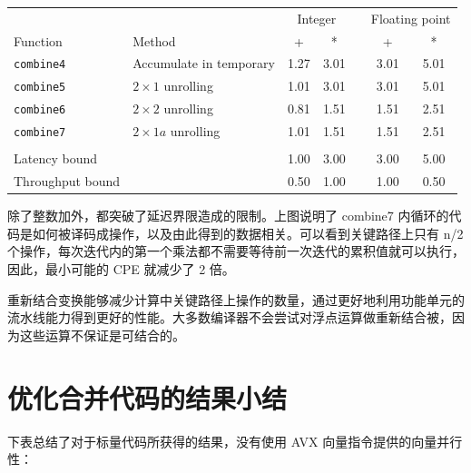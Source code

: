\begin{table}[!ht]
    \centering
    \begin{tabular}{llccccc}
        \toprule
        & & \multicolumn{2}{c}{Integer} & & \multicolumn{2}{c}{Floating point} \\
        \cmidrule{3-4} \cmidrule{6-7}
        Function & Method & + & * & & + & * \\
        \midrule
        \texttt{combine4} & Accumulate in temporary & 1.27 & 3.01 & & 3.01 & 5.01 \\
        \texttt{combine5} & $2 \times 1$ unrolling & 1.01 & 3.01 & & 3.01 & 5.01 \\
        \texttt{combine6} & $2 \times 2$ unrolling & 0.81 & 1.51 & & 1.51 & 2.51 \\
        \texttt{combine7} & $2 \times 1a$ unrolling & 1.01 & 1.51 & & 1.51 & 2.51 \\
        \\
        Latency bound & & 1.00 & 3.00 & & 3.00 & 5.00 \\
        Throughput bound & & 0.50 & 1.00 & & 1.00 & 0.50 \\
        \bottomrule
    \end{tabular}
\end{table}

除了整数加外，都突破了延迟界限造成的限制。上图说明了 combine7 内循环的代码是如何被译码成操作，以及由此得到的数据相关。可以看到关键路径上只有 n/2 个操作，每次迭代内的第一个乘法都不需要等待前一次迭代的累积值就可以执行，因此，最小可能的 CPE 就减少了 2 倍。

重新结合变换能够减少计算中关键路径上操作的数量，通过更好地利用功能单元的流水线能力得到更好的性能。大多数编译器不会尝试对浮点运算做重新结合被，因为这些运算不保证是可结合的。

\section{优化合并代码的结果小结}

下表总结了对于标量代码所获得的结果，没有使用 AVX 向量指令提供的向量并行性：

